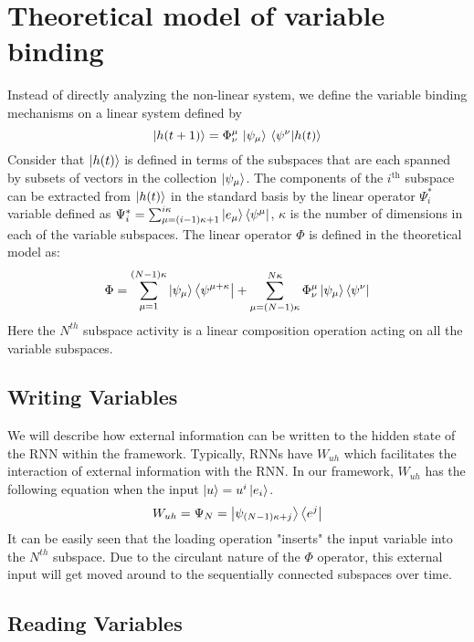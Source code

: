 \documentclass[11pt]{article}
\theoremstyle{definition}
\begin{document}
\section{Theoretical model of variable binding}
%
Instead of directly analyzing the non-linear system, we define the variable binding mechanisms on a linear system defined by
%
\begin{dmath}
    \ket{h(t+1)} = \Phi_{\nu}^\mu \, \ket{\psi_\mu} \, \bra{\psi^\nu} \ket{h(t)}
\end{dmath}
%
Consider that $\ket{h(t)}$ is defined in terms of the subspaces that are each spanned by subsets of vectors in the collection $\ket{\psi_\mu}$. The components of the $i^{\text{th}}$ subspace can be extracted from $\ket{h(t)}$ in the standard basis by the linear operator $\Psi^*_i$ variable defined as $ \Psi^*_i = \sum_{\mu=(i-1)\kappa + 1}^{i \kappa} \ket{e_\mu} \bra{\psi^\mu}$, $\kappa$ is the number of dimensions in each of the variable subspaces.
%
The linear operator $\Phi$ is defined in the theoretical model as:
%
\begin{dmath}
    \Phi = \sum_{\mu=1}^{(N-1) \kappa} \ket{\psi_{\mu}} \bra{\psi^{\mu+\kappa}} + \sum_{\mu=(N-1)\kappa}^{N \kappa} \Phi_{\nu}^{\mu} \ket{\psi_\mu} \bra{\psi^\nu}
\end{dmath}
%
Here the $N^{th}$ subspace activity is a linear composition operation acting on all the variable subspaces. 
%
\subsection{Writing Variables}

We will describe how external information can be written to the hidden state of the RNN within the framework. Typically, RNNs have $W_{uh}$ which facilitates the interaction of external information with the RNN. In our framework, $W_{uh}$ has the following equation when the input $\ket{u} = u^i \ket{e_i}$.
%
\begin{dmath}
    W_{uh} = \Psi_N = \ket{\psi_{(N-1)\kappa + j}} \bra{e^j}
\end{dmath}
%
It can be easily seen that the loading operation "inserts" the input variable into the $N^{th}$ subspace. Due to the circulant nature of the $\Phi$ operator, this external input will get moved around to the sequentially connected subspaces over time. 

\subsection{Reading Variables}
\end{document}

